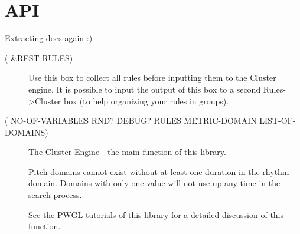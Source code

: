 \documentclass[letterpaper,10pt,english]{sphinxmanual}
\begin{document}
\section{API}
\label{\detokenize{API:api}}
Extracting docs again :)

\begin{description}
\item[{ ( \&REST RULES)}] \leavevmode
Use this box to collect all rules before inputting them to the Cluster engine. It is possible to input the output of this box to a second Rules-\textgreater{}Cluster box (to help organizing your rules in groups).

\end{description}

\begin{description}
\item[{ ( NO-OF-VARIABLES RND? DEBUG? RULES METRIC-DOMAIN LIST-OF-DOMAINS)}] \leavevmode
The Cluster Engine - the main function of this library.

Pitch domains cannot exist without at least one duration in the rhythm domain. Domains with only one value will not use up any time in the search process.

See the PWGL tutorials of this library for a detailed discussion of this function.

\end{description}
\end{document}
